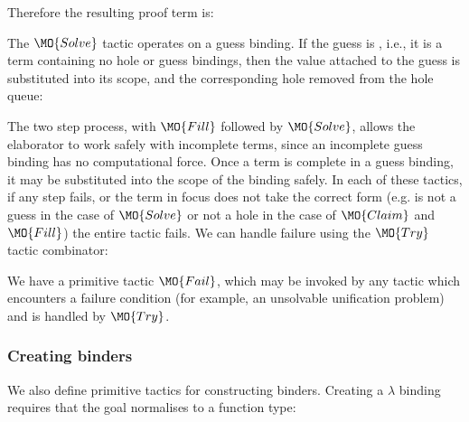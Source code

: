\noindent
Therefore the resulting proof term is:


The $\MO{Solve}$ tactic operates on a guess binding. If the guess is , i.e., it
is a \TT{} term containing no hole or guess bindings, then the value attached to
the guess is substituted into its scope, and the corresponding hole removed
from the hole queue:


The two step process, with $\MO{Fill}$ followed by $\MO{Solve}$, allows the elaborator
to work safely with incomplete terms, since an incomplete guess binding has no 
computational force. Once a term is complete in a guess binding, it may be substituted into the 
scope of the binding safely.
In each of these tactics, if any step fails, or the term in focus does not take
the correct form (e.g. is not a guess in the case of $\MO{Solve}$ or not a hole
in the case of $\MO{Claim}$ and $\MO{Fill}$) the entire tactic fails. We can
handle failure using the $\MO{Try}$ tactic combinator:


We have a primitive tactic $\MO{Fail}$, which may be invoked by
any tactic which encounters a failure condition (for example, an unsolvable unification
problem) and is handled by $\MO{Try}$.

\subsubsection{Creating binders}

We also define primitive tactics for constructing binders. Creating a $\lambda$
binding requires that the goal normalises to a function type:


